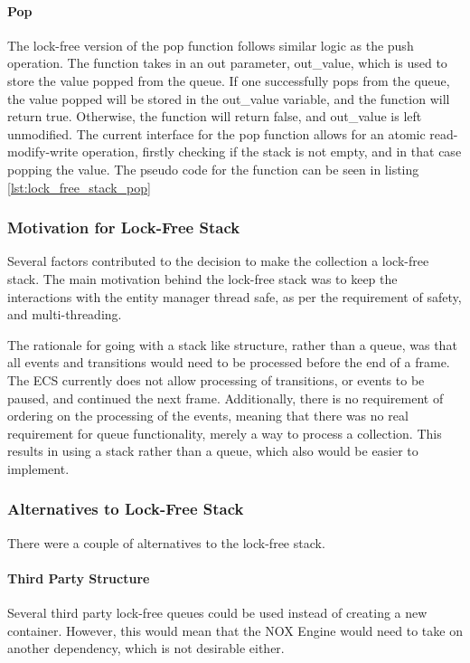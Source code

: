 \paragraph{Pop}
The lock-free version of the pop function follows similar logic as the push operation.
The function takes in an out parameter, out\_value, which is used to store the value popped from the queue.
If one successfully pops from the queue, the value popped will be stored in the out\_value variable,
and the function will return true. Otherwise, the function will return false, and out\_value is left
unmodified.
The current interface for the pop function allows for an atomic read-modify-write operation, firstly checking if the stack is not empty, and in that case popping the value.
The pseudo code for the function can be seen in listing \ref{lst:lock_free_stack_pop}


\subsubsection{Motivation for Lock-Free Stack}
Several factors contributed to the decision to make the collection a lock-free stack.
The main motivation behind the lock-free stack was to keep the interactions with the entity manager thread safe, as per the requirement of safety, and multi-threading.

The rationale for going with a stack like structure, rather than a queue, was that all events and transitions would need to be processed before the end of a frame. 
The ECS currently does not allow processing of transitions, or events to be paused, and continued the next frame. 
Additionally, there is no requirement of ordering on the processing of the events, meaning that there was no real requirement for queue functionality, merely a way to process a collection. 
This results in using a stack rather than a queue, which also would be easier to implement.

\subsubsection{Alternatives to Lock-Free Stack}
There were a couple of alternatives to the lock-free stack.

\paragraph{Third Party Structure}
Several third party lock-free queues could be used instead of creating a new container. However, this would mean that the NOX Engine would need to take on another dependency, which is not desirable either.

